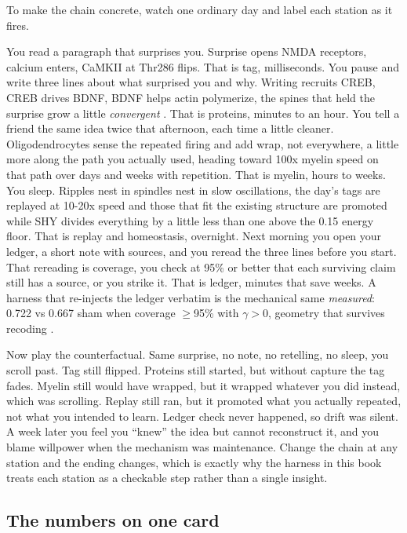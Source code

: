 To make the chain concrete, watch one ordinary day and label each station as it fires.

You read a paragraph that surprises you. Surprise opens NMDA receptors, calcium enters, CaMKII at Thr286 flips. That is tag, milliseconds. You pause and write three lines about what surprised you and why. Writing recruits CREB, CREB drives BDNF, BDNF helps actin polymerize, the spines that held the surprise grow a little \textit{convergent} \citep{kandel2000}. That is proteins, minutes to an hour. You tell a friend the same idea twice that afternoon, each time a little cleaner. Oligodendrocytes sense the repeated firing and add wrap, not everywhere, a little more along the path you actually used, heading toward 100x myelin speed on that path over days and weeks with repetition. That is myelin, hours to weeks. You sleep. Ripples nest in spindles nest in slow oscillations, the day's tags are replayed at 10-20x speed and those that fit the existing structure are promoted while SHY divides everything by a little less than one above the 0.15 energy floor. That is replay and homeostasis, overnight. Next morning you open your ledger, a short note with sources, and you reread the three lines before you start. That rereading is coverage, you check at 95\% or better that each surviving claim still has a source, or you strike it. That is ledger, minutes that save weeks. A harness that re-injects the ledger verbatim is the mechanical same \textit{measured}: 0.722 vs 0.667 sham when coverage $\geq$95\% with $\gamma>0$, geometry that survives recoding \citep{jha2025}.

Now play the counterfactual. Same surprise, no note, no retelling, no sleep, you scroll past. Tag still flipped. Proteins still started, but without capture the tag fades. Myelin still would have wrapped, but it wrapped whatever you did instead, which was scrolling. Replay still ran, but it promoted what you actually repeated, not what you intended to learn. Ledger check never happened, so drift was silent. A week later you feel you ``knew'' the idea but cannot reconstruct it, and you blame willpower when the mechanism was maintenance. Change the chain at any station and the ending changes, which is exactly why the harness in this book treats each station as a checkable step rather than a single insight.

\subsection*{The numbers on one card}

